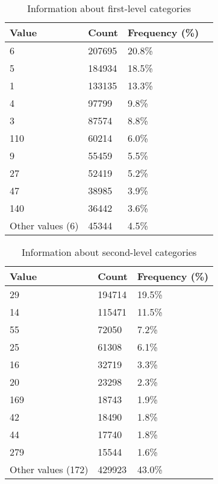 \begin{table}[h]
	\centering
	\caption{Information about first-level categories}
	\label{lvl1}
	\begin{tabular}{|l|l|l|l|}
		\hline
	\textbf{Value }             & \textbf{Count}  & \textbf{Frequency} (\%) \\ \hline
		6                & 207695 & 20.8\%           \\ \hline
		5                & 184934 & 18.5\%           \\ \hline
		1                & 133135 & 13.3\%           \\ \hline
		4                & 97799  & 9.8\%            \\ \hline
		3                & 87574  & 8.8\%           \\ \hline
		110              & 60214  & 6.0\%            \\ \hline
		9                & 55459  & 5.5\%            \\ \hline
		27               & 52419  & 5.2\%            \\ \hline
		47               & 38985  & 3.9\%            \\ \hline
		140              & 36442  & 3.6\%           \\ \hline
		Other values (6) & 45344  & 4.5\%            \\ \hline
	\end{tabular}
\end{table}


\begin{table}[h]
	\centering
	\caption{Information about second-level categories}
	\label{my-label}
	\begin{tabular}{|l|l|l|}
		\hline
		\textbf{Value }             & \textbf{Count}  & \textbf{Frequency} (\%) \\ \hline
		29                 & 194714 & 19.5\%         \\ \hline
		14                 & 115471 & 11.5\%         \\ \hline
		55                 & 72050  & 7.2\%          \\ \hline
		25                 & 61308  & 6.1\%          \\ \hline
		16                 & 32719  & 3.3\%          \\ \hline
		20                 & 23298  & 2.3\%          \\ \hline
		169                & 18743  & 1.9\%          \\ \hline
		42                 & 18490  & 1.8\%          \\ \hline
		44                 & 17740  & 1.8\%          \\ \hline
		279                & 15544  & 1.6\%          \\ \hline
		Other values (172) & 429923 & 43.0\%         \\ \hline
	\end{tabular}
\end{table}


